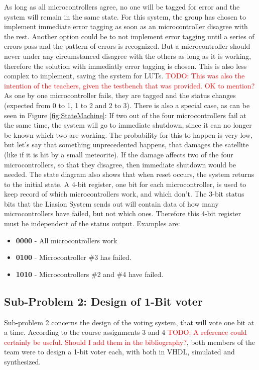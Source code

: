 \documentclass[a4paper]{IEEEtran}
\newcommand\TODO[1]{\textcolor{red}{TODO:#1}}
\newcommand\todo[1]{\TODO{#1}}
\begin{document}
As long as all microcontrollers agree, no one will be tagged for error and the system will remain in the same state.
For this system, the group has chosen to implement immediate error tagging as soon as an microcontroller disagree with the rest.
Another option could be to not implement error tagging until a series of errors pass and the pattern of errors is recognized.
But a microcontroller should never under any circumstanced disagree with the others as long as it is working, therefore the solution with immediatly error tagging is chosen.
This is also less complex to implement, saving the system for LUTs.
\todo{ This was also the intention of the teachers, given the testbench that was provided. OK to mention?}
As one by one microcontroller fails, they are tagged and the status changes (expected from 0 to 1, 1 to 2 and 2 to 3).
There is also a special case, as can be seen in Figure \ref{fig:StateMachine}:
If two out of the four microcontrollers fail at the same time, the system will go to immediate shutdown, since it can no longer be known which two are working.
The probability for this to happen is very low, but let's say that something unprecedented happens, that damages the satellite (like if it is hit by a small meteorite).
If the damage affects two of the four microcontrollers, so that they disagree, then immediate shutdown would be needed.
The state diagram also shows that when reset occurs, the system returns to the initial state.
A 4-bit register, one bit for each microcontroller, is used to keep record of which microcontrollers work, and which don't.
The 3-bit status bits that the Liasion System sends out will contain data of how many microcontrollers have failed, but not which ones.
Therefore this 4-bit register must be independent of the status output.
Examples are:
\begin{itemize}
    \item \textbf{0000} - All microcontrollers work
    \item \textbf{0100} - Microcontroller \#3 has failed.
    \item \textbf{1010} - Microcontrollers \#2 and \#4 have failed.
\end{itemize}

\subsection{Sub-Problem 2: Design of 1-Bit voter}
Sub-problem 2 concerns the design of the voting system, that will vote one bit at a time.
According to the course assignments 3 and 4 \todo{ A reference could certainly be useful. Should I add them in the bibliography?}, both members of the team were to design a 1-bit voter each, with both in VHDL, simulated and synthesized. 
\end{document}
